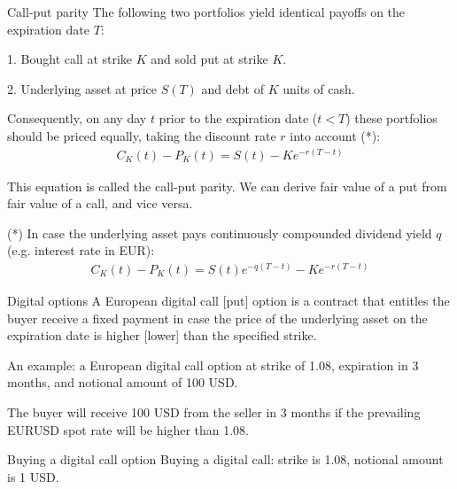 \documentclass{beamer}
\begin{document}
\begin{frame}{Call-put parity}
\justify
The following two portfolios yield identical payoffs on the expiration date $T$:

1. Bought call at strike $K$ and sold put at strike $K$.

2. Underlying asset at price $S(T)$ and debt of $K$ units of cash.

\justify
Consequently, on any day $t$ prior to the expiration date ($t<T$) these portfolios should be priced equally, taking the discount rate $r$ into account (*):
\begin{align*}
C_K(t) - P_K(t) = S(t) - Ke^{-r(T-t)}
\end{align*}

\justify
This equation is called the \alert{call-put parity}. We can derive fair value of a put from fair value of a call, and vice versa.

\justify
(*) In case the underlying asset pays continuously compounded dividend yield $q$ (e.g. interest rate in EUR):
\begin{align*}
C_K(t) - P_K(t) = S(t)e^{-q(T-t)} - Ke^{-r(T-t)}
\end{align*}
\end{frame}



\begin{frame}{Digital options}
\justify
A European \alert{digital call [put]} option is a contract that entitles the buyer receive a fixed payment in case the price of the underlying asset on the expiration date is higher [lower] than the specified strike.

\justify
An example: a European digital call option at strike of 1.08, expiration in 3 months, and notional amount of 100 USD. 

\justify
The buyer will receive 100 USD from the seller in 3 months if the prevailing EURUSD spot rate will be higher than 1.08.
\end{frame}



\begin{frame}{Buying a digital call option}
\justifying
Buying a digital call: strike is 1.08, notional amount is 1 USD.

\justifying
\centering
\end{frame}
\end{document}
